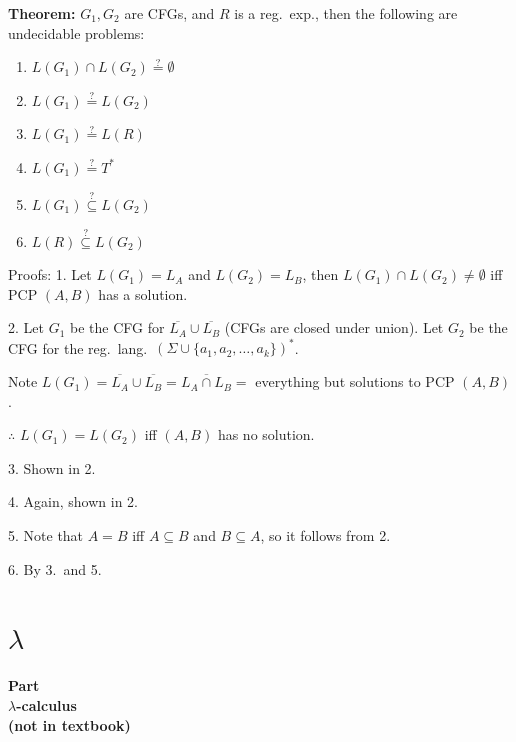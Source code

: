 \begin{frame}

{\bf Theorem:} $G_1,G_2$ are CFGs, and $R$ is a reg.\ exp., then the
following are undecidable problems:
\begin{enumerate}
\item  $L(G_1)\cap L(G_2)\stackrel{?}{=}\emptyset$
\item  $L(G_1)\stackrel{?}{=} L(G_2)$
\item  $L(G_1)\stackrel{?}{=} L(R)$
\item  $L(G_1)\stackrel{?}{=} T^*$
\item  $L(G_1)\stackrel{?}{\subseteq} L(G_2)$
\item  $L(R)\stackrel{?}{\subseteq} L(G_2)$
\end{enumerate}
\end{frame}

\begin{frame}
Proofs: 1. Let $L(G_1)=L_A$ and $L(G_2)=L_B$, then $L(G_1)\cap
L(G_2)\neq\emptyset$ iff PCP $(A,B)$ has a solution.

2.  Let $G_1$ be the CFG for $\overline{L_A}\cup\overline{L_B}$ (CFGs
are closed under union).  Let $G_2$ be the CFG for the reg.\ lang.\
$(\Sigma\cup\{a_1,a_2,\ldots,a_k\})^*$.  

Note
$L(G_1)=\overline{L_A}\cup\overline{L_B}=\overline{L_A\cap L_B}=$
everything but solutions to PCP $(A,B)$.

$\therefore$ $L(G_1)=L(G_2)$ iff $(A,B)$ has no solution.

3.  Shown in 2.

4.  Again, shown in 2.

5.  Note that $A=B$ iff $A\subseteq B$ and $B\subseteq A$, so it
follows from 2.

6.  By 3.\ and 5.
\end{frame}

\section{$\lambda$}

\begin{frame}
\begin{center}
\addtocounter{part}{1}
{\bf Part  \\ $\lambda$-calculus \\ (not in textbook)} 
\end{center}
\end{frame}

